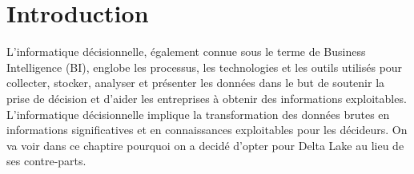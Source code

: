 
\section*{Introduction}

L'informatique décisionnelle, également connue sous le terme de Business Intelligence (BI), englobe les processus, les technologies et les outils utilisés pour collecter, stocker, analyser et présenter les données dans le but de soutenir la prise de décision et d'aider les entreprises à obtenir des informations exploitables. L'informatique décisionnelle implique la transformation des données brutes en informations significatives et en connaissances exploitables pour les décideurs. On va voir dans ce chaptire pourquoi on a decidé d'opter pour Delta Lake au lieu de ses contre-parts.

